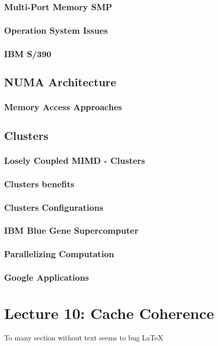 \documentclass[titlepage, a4paper]{article}
\begin{document}
\subsubsection{Multi-Port Memory SMP}
\subsubsection{Operation System Issues}
\subsubsection{IBM S/390}
\subsection{NUMA Architecture}
\subsubsection{Memory Access Approaches}
\subsection{Clusters}
\subsubsection{Losely Coupled MIMD - Clusters}
\subsubsection{Clusters benefits}
\subsubsection{Clusters Configurations}
\subsubsection{IBM Blue Gene Supercomputer}
\subsubsection{Parallelizing Computation}
\subsubsection{Google Applications}

\section{Lecture 10: Cache Coherence}
To many section without text seems to bug \LaTeX
\end{document}
